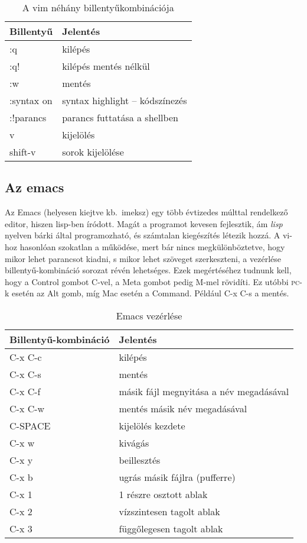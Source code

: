 \begin{table}\center%
\begin{tabular}{ll}\toprule
Billentyű & Jelentés\\\midrule
:q & kilépés\\
:q!& kilépés mentés nélkül\\
:w & mentés\\
:syntax on & syntax highlight -- kódszínezés\\
:!parancs & parancs futtatása a shellben\\
v & kijelölés\\
shift-v & sorok kijelölése\\
\bottomrule
\end{tabular}
  \caption{A vim néhány billentyűkombinációja}
  \label{tab:vim-ex}
\end{table}


\subsection{Az emacs}

Az Emacs (helyesen kiejtve kb.\ imeksz) egy több évtizedes múlttal rendelkező
editor, hiszen lisp-ben íródott. Magát a programot kevesen fejlesztik, ám
\emph{lisp} nyelven bárki által programozható, és számtalan kiegészítés létezik
hozzá. A vi-hoz hasonlóan szokatlan a működése, mert bár nincs megkülönböztetve,
hogy mikor lehet parancsot kiadni, s mikor lehet szöveget szerkeszteni, a
vezérlése billentyű-kombináció sorozat révén lehetséges. Ezek megértéséhez
tudnunk kell, hogy a Control gombot C-vel, a Meta gombot pedig M-mel
rövidíti. Ez utóbbi \textsc{pc}-k esetén az Alt gomb, míg Mac esetén a
Command. Például C-x C-s a mentés.

\begin{table}\center
\begin{tabular}{ll}\bottomrule
Billentyű-kombináció &Jelentés\\\midrule
C-x C-c & kilépés\\
C-x C-s & mentés\\
C-x C-f & másik fájl megnyitása a név megadásával\\
C-x C-w & mentés másik név megadásával\\
C-SPACE & kijelölés kezdete\\
C-x w   & kivágás\\
C-x y   & beillesztés\\\midrule
C-x b   & ugrás másik fájlra (pufferre)\\
C-x 1   & 1 részre osztott ablak\\
C-x 2   & vízszintesen tagolt ablak\\
C-x 3   & függőlegesen tagolt ablak\\
\bottomrule
\end{tabular}
  \caption{Emacs vezérlése}
  \label{table:emacs}
\end{table}



